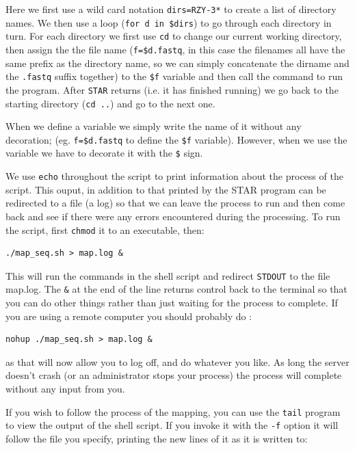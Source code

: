 \documentclass[11pt]{article}
\begin{document}
Here we first use a wild card notation \texttt{dirs=RZY-3*} to create a list of
directory names. We then use a loop (\texttt{for d in \$dirs}) to go through each
directory in turn. For each directory we first use \texttt{cd} to change our current
working directory, then assign the the file name (\texttt{f=\$d.fastq}, in this case
the filenames all have the same prefix as the directory name, so we can
simply concatenate the dirname and the \texttt{.fastq} suffix together) to the \texttt{\$f}
variable and then call the command to run the program. After \texttt{STAR} returns
(i.e. it has finished running) we go back to the starting directory (\texttt{cd ..})
and go to the next one.

When we define a variable we simply write the name of it without any
decoration; (eg. \texttt{f=\$d.fastq} to define the \texttt{\$f} variable). However, when we
use the variable we have to decorate it with the \texttt{\$} sign.

We use \texttt{echo} throughout the script to print
information about the process of the script. This ouput, in addition to that
printed by the STAR program can be redirected to a file (a log) so that we
can leave the process to run and then come back and see if there were any
errors encountered during the processing. To run the script, first \texttt{chmod} it
to an executable, then:

\begin{verbatim}
./map_seq.sh > map.log &
\end{verbatim}

This will run the commands in the shell script and redirect \texttt{STDOUT} to the
file map.log. The \texttt{\&} at the end of the line returns control back to the
terminal so that you can do other things rather than just waiting for the
process to complete.
If you are using a remote computer you should probably do :

\begin{verbatim}
nohup ./map_seq.sh > map.log &
\end{verbatim}

as that will now allow you to log off, and do whatever you like. As long the
server doesn't crash (or an administrator stops your process) the process
will complete without any input from you.

If you wish to follow the process of the mapping, you can use the
\texttt{tail} program to view the output of the shell script. If you invoke
it with the \texttt{-f} option it will follow the file you specify, printing
the new lines of it as it is written to:
\end{document}
